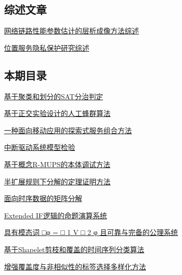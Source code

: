 \documentclass[a4paper]{article}
\begin{document}
\subsection{综述文章}
\href{http://www.jos.org.cn/ch/reader/download_pdf.aspx?file_no=4867&year_id=2015&quarter_id=9&falg=1}{网络链路性能参数估计的层析成像方法综述}

\href{http://www.jos.org.cn/ch/reader/download_pdf.aspx?file_no=4857&year_id=2015&quarter_id=9&falg=1}{位置服务隐私保护研究综述}

\subsection{本期目录}
\href{http://www.jos.org.cn/ch/reader/download_pdf.aspx?file_no=4799&year_id=2015&quarter_id=9&falg=1}{基于聚类和划分的SAT分治判定}

\href{http://www.jos.org.cn/ch/reader/download_pdf.aspx?file_no=4800&year_id=2015&quarter_id=9&falg=1}{基于正交实验设计的人工蜂群算法}

\href{http://www.jos.org.cn/ch/reader/download_pdf.aspx?file_no=4607&year_id=2015&quarter_id=9&falg=1}{一种面向移动应用的探索式服务组合方法}

\href{http://www.jos.org.cn/ch/reader/download_pdf.aspx?file_no=4713&year_id=2015&quarter_id=9&falg=1}{中断驱动系统模型检验}

\href{http://www.jos.org.cn/ch/reader/download_pdf.aspx?file_no=4735&year_id=2015&quarter_id=9&falg=1}{基于概念R-MUPS的本体调试方法}

\href{http://www.jos.org.cn/ch/reader/download_pdf.aspx?file_no=4734&year_id=2015&quarter_id=9&falg=1}{半扩展规则下分解的定理证明方法}

\href{http://www.jos.org.cn/ch/reader/download_pdf.aspx?file_no=4718&year_id=2015&quarter_id=9&falg=1}{面向时序数据的矩阵分解}

\href{http://www.jos.org.cn/ch/reader/download_pdf.aspx?file_no=4705&year_id=2015&quarter_id=9&falg=1}{Extended IF逻辑的命题演算系统}

\href{http://www.jos.org.cn/ch/reader/download_pdf.aspx?file_no=4748&year_id=2015&quarter_id=9&falg=1}{具有模态词 □φ = □ 1 V □ 2 φ 且可靠与完备的公理系统}

\href{http://www.jos.org.cn/ch/reader/download_pdf.aspx?file_no=4702&year_id=2015&quarter_id=9&falg=1}{基于Shapelet剪枝和覆盖的时间序列分类算法}

\href{http://www.jos.org.cn/ch/reader/download_pdf.aspx?file_no=4736&year_id=2015&quarter_id=9&falg=1}{增强覆盖度与非相似性的标签选择多样化方法}
\end{document}
